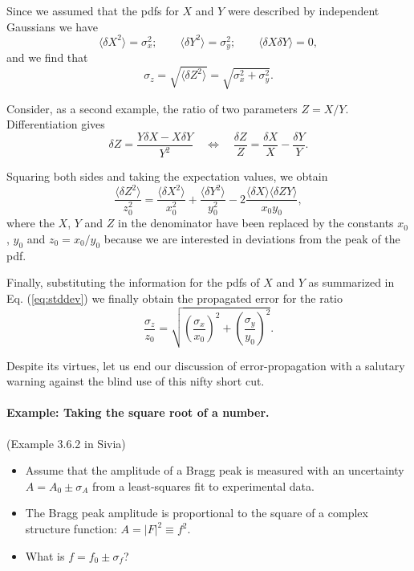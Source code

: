 \documentclass[%
oneside,                 %
final,                   %
10pt]{article}
\begin{document}
Since we assumed that the pdfs for $X$ and $Y$ were described by independent Gaussians we have
\begin{equation}
\langle \delta X^2 \rangle = \sigma_x^2; \qquad \langle \delta Y^2 \rangle = \sigma_y^2; \qquad \langle \delta X \delta Y \rangle = 0,
\label{eq:stddev}
\end{equation}
and we find that
\[
\sigma_z = \sqrt{ \langle \delta Z^2 \rangle } = \sqrt{ \sigma_x^2 + \sigma_y^2 }.
\]

Consider, as a second example, the ratio of two parameters $Z = X/Y$. Differentiation gives
\[
\delta Z = \frac{Y \delta X - X \delta Y}{Y^2} \quad \Leftrightarrow \quad \frac{\delta Z}{Z} = \frac{\delta X}{X} - \frac{\delta Y}{Y}.
\]

Squaring both sides and taking the expectation values, we obtain
\[
\frac{\langle \delta Z^2 \rangle}{z_0^2} = \frac{\langle \delta X^2 \rangle}{x_0^2} + \frac{\langle \delta Y^2 \rangle}{y_0^2} - 2 \frac{\langle \delta X \rangle \langle \delta ZY \rangle}{x_0 y_0},
\]
where the $X$, $Y$ and $Z$ in the denominator have been replaced by the constants $x_0$, $y_0$ and $z_0 = x_0 / y_0$ because we are interested in deviations from the peak of the pdf.

Finally, substituting the information for the pdfs of $X$ and $Y$ as summarized in Eq. (\ref{eq:stddev}) we finally obtain the propagated error for the ratio
\[
\frac{\sigma_z}{z_0} = \sqrt{ \left( \frac{\sigma_x}{x_0} \right)^2 + \left( \frac{\sigma_y}{y_0} \right)^2}.
\]

Despite its virtues, let us end our discussion of error-propagation with a salutary warning against the blind use of this nifty short cut.



\paragraph{Example: Taking the square root of a number.}
(Example 3.6.2 in Sivia)

\begin{itemize}
\item Assume that the amplitude of a Bragg peak is measured with an uncertainty $A = A_0 \pm \sigma_A$ from a least-squares fit to experimental data.

\item The Bragg peak amplitude is proportional to the square of a complex structure function: $A = |F|^2 \equiv f^2$.

\item What is $f = f_0 \pm \sigma_f$?
\end{itemize}
\end{document}
